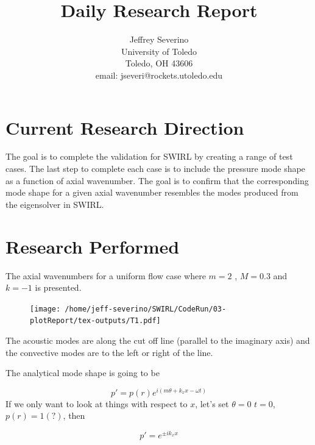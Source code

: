 \documentclass[a4paper]{article}
\begin{document}
\begin{titlepage}

    \title{
    Daily Research Report}

    \author{ Jeffrey Severino \\
        University of Toledo \\
        Toledo, OH  43606 \\
    email: jseveri@rockets.utoledo.edu}


    \maketitle

\end{titlepage}
\section{Current Research Direction}
The goal is to complete the validation for SWIRL by creating a range of test
cases. The last step to complete each case is to include the pressure mode shape
as a function of axial wavenumber. The goal is to confirm that the corresponding 
mode shape for a given axial wavenumber resembles the modes produced 
from the eigensolver in SWIRL. 

\section{Research Performed}
The axial wavenumbers for a uniform flow case where $m = 2$ , $M = 0.3$ and 
$k = -1$ is presented. 

 \begin{figure}[h!]
     \centering
     \texttt{[image: /home/jeff-severino/SWIRL/CodeRun/03-plotReport/tex-outputs/T1.pdf]}
 \end{figure}

 The acoustic modes are along the cut off line (parallel to the imaginary axis)
 and the convective modes are to the left or right of the line. 

 The analytical mode shape is going to be 

 \begin{equation}
     p' = p(r) e^{i(m \theta + k_x x - \omega t)}
 \end{equation}
 If we only want to look at things with respect to $x$, let's set $\theta = 0$
 $t = 0$, $p(r) = 1 (?)$, then


 \begin{equation}
     p' = e^{\pm i k_x x }
 \end{equation}
\end{document}
